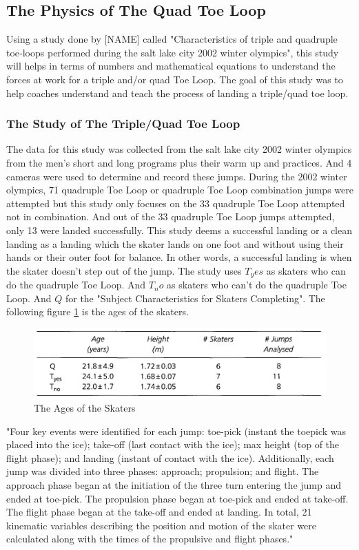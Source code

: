 \documentclass[12pt,journal,compsoc]{IEEEtran}
\begin{document}
\subsection{The Physics of The Quad Toe Loop}
Using a study done by [NAME] called "Characteristics of triple and quadruple toe‐loops performed during the salt lake city 2002 winter olympics", this study will helps in terms of numbers and mathematical equations to understand the forces at work for a triple and/or quad Toe Loop. The goal of this study was to help coaches understand and teach the process of landing a triple/quad toe loop. 

\subsubsection{The Study of The Triple/Quad Toe Loop}
The data for this study was collected from the salt lake city 2002 winter olympics from the men's short and long programs plus their warm up and practices. And 4 cameras were used to determine and record these jumps. During the 2002 winter olympics,  71 quadruple Toe Loop or quadruple Toe Loop combination jumps were attempted but this study only focuses on the 33 quadruple Toe Loop attempted not in combination. And out of the 33 quadruple Toe Loop jumps attempted, only 13 were landed successfully. This study deems a successful landing or a clean landing as a landing which the skater lands on one foot and without using their hands or their outer foot for balance. In other words, a successful landing is when the skater doesn't step out of the jump. The study uses $T_yes$ as skaters who can do the quadruple Toe Loop. And $T_no$ as skaters who can't do the quadruple Toe Loop. And $Q$ for the "Subject Characteristics for Skaters Completing"\cite{Toe}. The following figure \ref{Fig:ToeLoopAges} is the ages of the skaters. 
\begin{figure}[h]
	\centering
	\includegraphics[width=\linewidth]{toe_ages.JPG}
	\caption{The Ages of the Skaters}
	\label{Fig:ToeLoopAges}
\end{figure}
"Four key events were identified for each jump: toe-pick (instant the toepick was placed into the ice); take-off (last contact with the ice); max height
(top of the flight phase); and landing (instant of contact with the ice).
Additionally, each jump was divided into three phases: approach; propulsion;
and flight. The approach phase began at the initiation of the three
turn entering the jump and ended at toe-pick. The propulsion phase began at
toe-pick and ended at take-off. The flight phase began at the take-off and ended at landing. In total, 21 kinematic variables describing the position and motion of the skater were calculated along with the times of the propulsive and flight phases." \cite{Toe}
\end{document}
